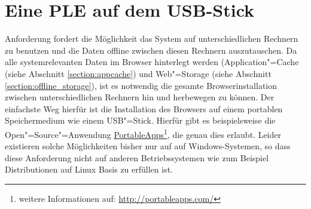 \section{Eine \ac{PLE} auf dem USB-Stick}\label{section:ple_auf_usb}
Anforderung  fordert die Möglichkeit das System auf unterschiedlichen Rechnern zu benutzen und die Daten offline zwischen diesen Rechnern auszutauschen. Da alle systemrelevanten Daten im Browser hinterlegt werden (Application"=Cache (siehe Abschnitt \ref{section:appcache}) und Web"=Storage (siehe Abschnitt \ref{section:offline_storage}), ist es notwendig die gesamte Browserinstallation zwischen unterschiedlichen Rechnern hin und herbewegen zu können. Der einfachste Weg hierfür ist die Installation des Browsers auf einem portablen Speichermedium wie einem USB"=Stick. Hierfür gibt es beispielsweise die Open"=Source"=Anwendung \href{http://portableapps.com/}{PortableApps}\footnote{weitere Informationen auf: \url{http://portableapps.com/}}, die genau dies erlaubt. Leider existieren solche Möglichkeiten bisher nur auf auf Windows-Systemen, so dass diese Anforderung nicht auf anderen Betriebssystemen wie zum Beispiel Distributionen auf Linux Basis zu erfüllen ist. 